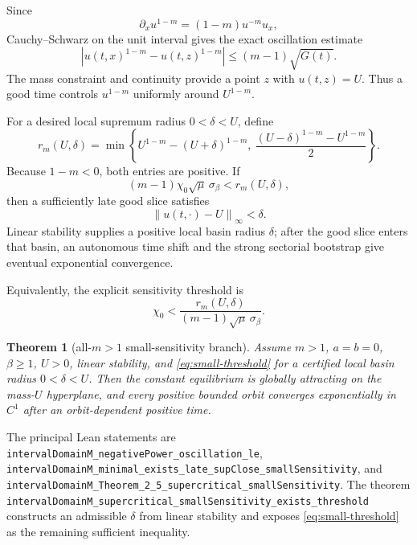 \documentclass[11pt]{article}
\newcommand{\norm}[1]{\left\lVert #1\right\rVert}
\newcommand{\abs}[1]{\left\lvert #1\right\rvert}
\newcommand{\code}[1]{\nolinkurl{#1}}
\newtheorem{theorem}{Theorem}
\begin{document}
Since
\[
  \partial_x u^{1-m}=(1-m)u^{-m}u_x,
\]
Cauchy--Schwarz on the unit interval gives the exact oscillation estimate
\begin{equation}
 \abs{u(t,x)^{1-m}-u(t,z)^{1-m}}
 \le(m-1)\sqrt{G(t)}.                                  \label{eq:osc}
\end{equation}
The mass constraint and continuity provide a point \(z\) with \(u(t,z)=U\).
Thus a good time controls \(u^{1-m}\) uniformly around \(U^{1-m}\).

For a desired local supremum radius \(0<\delta<U\), define
\begin{equation}
 r_m(U,\delta)=
 \min\left\{
  U^{1-m}-(U+\delta)^{1-m},\
  \frac{(U-\delta)^{1-m}-U^{1-m}}2
 \right\}.                                             \label{eq:r}
\end{equation}
Because \(1-m<0\), both entries are positive.  If
\begin{equation}
  (m-1)\chi_0\sqrt\mu\,\sigma_\beta<r_m(U,\delta),
  \label{eq:small}
\end{equation}
then a sufficiently late good slice satisfies
\[
  \norm{u(t,\cdot)-U}_\infty<\delta.
\]
Linear stability supplies a positive local basin radius \(\delta\); after
the good slice enters that basin, an autonomous time shift and the strong
sectorial bootstrap give eventual exponential convergence.

Equivalently, the explicit sensitivity threshold is
\begin{equation}
 \chi_0<
 \frac{r_m(U,\delta)}
 {(m-1)\sqrt\mu\,\sigma_\beta}.
 \label{eq:small-threshold}
\end{equation}

\begin{theorem}[all-\(m>1\) small-sensitivity branch]
Assume \(m>1\), \(a=b=0\), \(\beta\ge1\), \(U>0\), linear stability, and
\eqref{eq:small-threshold} for a certified local basin radius
\(0<\delta<U\).  Then the constant equilibrium is globally attracting on the
mass-\(U\) hyperplane, and every positive bounded orbit converges
exponentially in \(C^1\) after an orbit-dependent positive time.
\end{theorem}

\noindent The principal Lean statements are
\code{intervalDomainM_negativePower_oscillation_le},
\code{intervalDomainM_minimal_exists_late_supClose_smallSensitivity}, and
\code{intervalDomainM_Theorem_2_5_supercritical_smallSensitivity}.  The
theorem
\code{intervalDomainM_supercritical_smallSensitivity_exists_threshold}
constructs an admissible \(\delta\) from linear stability and exposes
\eqref{eq:small-threshold} as the remaining sufficient inequality.
\end{document}
